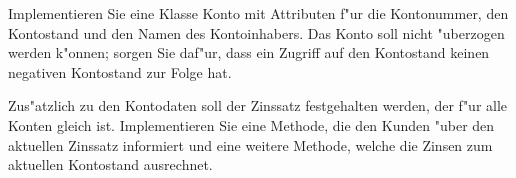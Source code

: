 \begin{aufgabe}[Konto]
\begin{teilaufgabe}
Implementieren Sie eine Klasse Konto mit Attributen f"ur die Kontonummer, den Kontostand und den Namen des Kontoinhabers. Das Konto soll nicht "uberzogen werden k"onnen; sorgen Sie daf"ur, dass ein Zugriff auf den Kontostand keinen negativen Kontostand zur Folge hat.
\end{teilaufgabe}
\begin{teilaufgabe}
Zus"atzlich zu den Kontodaten soll der Zinssatz festgehalten werden, der f"ur alle Konten gleich ist. Implementieren Sie eine Methode, die den Kunden "uber den aktuellen Zinssatz informiert und eine weitere Methode, welche die Zinsen zum aktuellen Kontostand ausrechnet.
\end{teilaufgabe}
\end{aufgabe}

